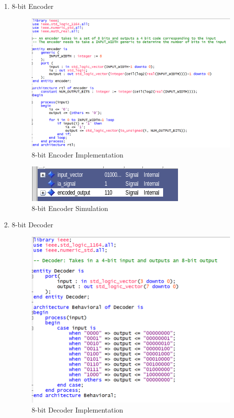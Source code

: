 \documentclass{article}
\begin{document}
\begin{enumerate}
  \item 8-bit Encoder
  \begin{figure}[H]
    \centering
    \includegraphics[scale=0.5]{Encoder_Impl.png}
    \caption{8-bit Encoder Implementation}
  \end{figure}

  \begin{figure}[H]
    \centering
    \includegraphics[scale=0.5]{encoder_tb.png}
    \caption{8-bit Encoder Simulation}
  \end{figure}
  \item 8-bit Decoder
  \begin{figure}[H]
    \centering
    \includegraphics[scale=0.5]{Decoder_Impl.png}
    \caption{8-bit Decoder Implementation}
  \end{figure}


\end{enumerate}
\end{document}

